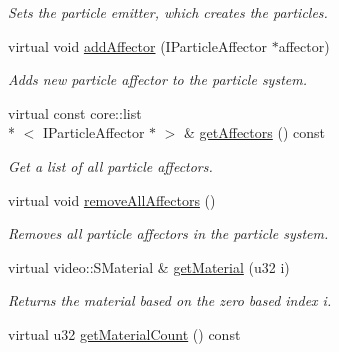 \begin{DoxyCompactItemize}
\begin{DoxyCompactList}\small\item\em Sets the particle emitter, which creates the particles. \end{DoxyCompactList}\item 
virtual void \hyperlink{classirr_1_1scene_1_1_c_particle_system_scene_node_a356f34f5b7c8e313179cb5809d6ac8d2}{add\-Affector} (I\-Particle\-Affector $\ast$affector)
\begin{DoxyCompactList}\small\item\em Adds new particle affector to the particle system. \end{DoxyCompactList}\item 
\hypertarget{classirr_1_1scene_1_1_c_particle_system_scene_node_a4100dbb60b2427643060bd08b6533c17}{virtual const core\-::list\\*
$<$ I\-Particle\-Affector $\ast$ $>$ \& \hyperlink{classirr_1_1scene_1_1_c_particle_system_scene_node_a4100dbb60b2427643060bd08b6533c17}{get\-Affectors} () const }\label{classirr_1_1scene_1_1_c_particle_system_scene_node_a4100dbb60b2427643060bd08b6533c17}

\begin{DoxyCompactList}\small\item\em Get a list of all particle affectors. \end{DoxyCompactList}\item 
\hypertarget{classirr_1_1scene_1_1_c_particle_system_scene_node_a6ca0ea3d5ddcfa24044eacf67d07b06f}{virtual void \hyperlink{classirr_1_1scene_1_1_c_particle_system_scene_node_a6ca0ea3d5ddcfa24044eacf67d07b06f}{remove\-All\-Affectors} ()}\label{classirr_1_1scene_1_1_c_particle_system_scene_node_a6ca0ea3d5ddcfa24044eacf67d07b06f}

\begin{DoxyCompactList}\small\item\em Removes all particle affectors in the particle system. \end{DoxyCompactList}\item 
\hypertarget{classirr_1_1scene_1_1_c_particle_system_scene_node_afef1cab6e7f8132b1724273f11bb5cb4}{virtual video\-::\-S\-Material \& \hyperlink{classirr_1_1scene_1_1_c_particle_system_scene_node_afef1cab6e7f8132b1724273f11bb5cb4}{get\-Material} (u32 i)}\label{classirr_1_1scene_1_1_c_particle_system_scene_node_afef1cab6e7f8132b1724273f11bb5cb4}

\begin{DoxyCompactList}\small\item\em Returns the material based on the zero based index i. \end{DoxyCompactList}\item 
\hypertarget{classirr_1_1scene_1_1_c_particle_system_scene_node_a614c1e7212ab08af5bc3cf4734ace881}{virtual u32 \hyperlink{classirr_1_1scene_1_1_c_particle_system_scene_node_a614c1e7212ab08af5bc3cf4734ace881}{get\-Material\-Count} () const }\label{classirr_1_1scene_1_1_c_particle_system_scene_node_a614c1e7212ab08af5bc3cf4734ace881}


\end{DoxyCompactItemize}
